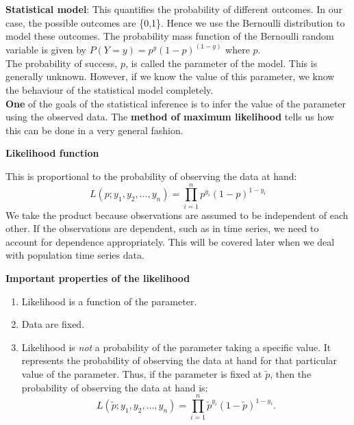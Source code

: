 \documentclass[10pt]{beamer}
\begin{document}
\begin{frame}
\textbf {Statistical model}: This quantifies the probability of different outcomes. In our case, the possible outcomes are \{0,1\}. Hence we use the Bernoulli distribution to model these outcomes. The probability mass function of the Bernoulli random variable is given by $P(Y=y)=p^y(1-p)^{(1-y)}$ where $p$.\\
The probability of success, $p$, is called the parameter of the model. This is generally unknown. However, if we know the value of this parameter, we know the behaviour of the statistical model completely.\\
\textbf{One} of the goals of the statistical inference is to infer the value of the parameter using the observed data. The \textbf{method of maximum likelihood} tells us how this can be done in a very general fashion.\\
\end{frame}

\begin{frame}
\begin{center}
\textbf {Likelihood function}
\end{center}
This is proportional to the probability of observing the data at hand: 
\begin{equation}
L(p; y_{1}, y_{2}, \ldots, y_{n}) = \prod_{i=1}^{n} p^{y_{i}} (1-p)^{1-y_{i}}
\end{equation}
We take the product because observations are assumed to be independent of each other. If the observations are dependent, such as in time series, we need to account for dependence appropriately. This will be covered later when we deal with population time series data. 
\end{frame}

\begin{frame}
\begin{center}
\textbf {Important properties of the likelihood}
\end{center}

\begin{enumerate}
\item Likelihood is a function of the parameter. 
\item Data are fixed. 
\item Likelihood is \emph{not} a probability of the parameter taking a specific value. It represents the probability of observing the data at hand for that particular value of the parameter. Thus, if the parameter is fixed at $\tilde{p}$, then the probability of observing the data at hand is:
\begin{equation}
L(\tilde{p}; y_{1}, y_{2}, \ldots, y_{n}) =\prod_{i=1}^{n} \tilde{p}^{y_{i}} (1-\tilde{p})^{1-y_{i}}. 
\end{equation}
\end{enumerate}
\end{frame}
\end{document}
